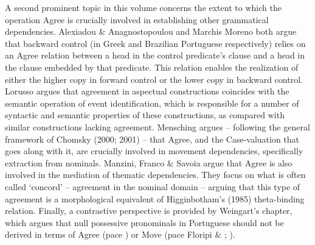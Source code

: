 \documentclass[output=paper]{langsci/langscibook}
\begin{document}
A second prominent topic in this volume concerns the extent to which the operation Agree is crucially involved in establishing other grammatical dependencies. Alexiadou \& Anagnostopoulou and Marchis Moreno both argue that backward control (in Greek and Brazilian Portuguese respectively) relies on an Agree relation between a head in the control predicate’s clause and a head in the clause embedded by that predicate. This relation enables the realization of either the higher copy in forward control or the lower copy in backward control. Lorusso argues that agreement in aspectual constructions coincides with the semantic operation of event identification, which is responsible for a number of syntactic and semantic properties of these constructions, as compared with similar constructions lacking agreement. Mensching argues – following the general framework of Chomsky (2000; 2001) – that Agree, and the Case-valuation that goes along with it, are crucially involved in movement dependencies, specifically extraction from nominals. Manzini, Franco \& Savoia argue that Agree is also involved in the mediation of thematic dependencies. They focus on what is often called ‘concord’ – agreement in the nominal domain – arguing that this type of agreement is a morphological equivalent of Higginbotham’s (1985) theta-binding relation. Finally, a contrastive perspective is provided by Weingart’s chapter, which argues that null possessive pronominals in Portuguese should not be derived in terms of Agree (pace \citealt{Hicks2009}) or Move (pace Floripi \& \citealt{Nunes2009}; \citealt{Rodrigues2010}).
\end{document}
